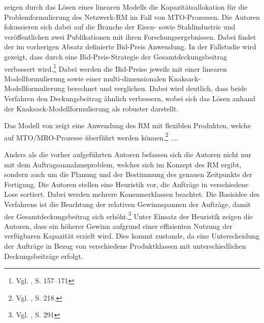 \cite{rehkopf:2005aa} zeigen durch das Lösen eines linearen Modells die Kapazitätsallokation für die Problemformulierung des Netzwerk-RM im Fall von MTO-Prozessen. Die Autoren fokussieren sich dabei auf die Branche der Eisen- sowie Stahlindustrie und veröffentlichen zwei Publikationen mit ihren Forschungsergebnissen. Dabei findet der im vorherigen Absatz definierte Bid-Preis Anwendung. In der Fallstudie wird gezeigt, dass durch eine Bid-Preis-Strategie der Gesamtdeckungsbeitrag verbessert wird.\footnote{Vgl. \cite{Spengler:2007aa}, S. 157–171} Dabei werden die Bid-Preise jeweils mit einer linearen Modellformulierung sowie einer multi-dimensionalen Knaksack-Modell\-for\-mu\-lier\-ung berechnet und verglichen. Dabei wird deutlich, dass beide Verfahren den Deckungsbeitrag ähnlich verbessern, wobei sich das Lösen anhand der Knaksack-Modell\-for\-mu\-lier\-ung als robuster darstellt. 

Das Modell von \cite{petrick2012using} zeigt eine Anwendung des RM mit flexiblen Produkten, welche auf MTO/MRO-Prozesse überführt werden können.\footnote{Vgl. \cite{petrick2012using}, S. 218.} ....

Anders als die vorher aufgeführten Autoren befassen sich die Autoren \cite{DECI:DECI074} nicht nur mit dem Auftragsannahmeproblem, welches sich im Konzept des RM ergibt, sondern auch um die Planung und der Bestimmung des genauen Zeitpunkts der Fertigung. Die Autoren stellen eine Heuristik vor, die Aufträge in verschiedene Lose sortiert. Dabei werden mehrere Konsumerklassen beachtet. Die Basisidee des Verfahrens ist die Beachtung der relativen Gewinnspannen der Aufträge, damit der Gesamtdeckungsbeitrag sich erhöht.\footnote{Vgl. \cite{DECI:DECI074}, S. 291} Unter Einsatz der Heuristik zeigen die Autoren, dass ein höherer Gewinn aufgrund einer effizienten Nutzung der verfügbaren Kapazität erzielt wird. Dies kommt zustande, da eine Unterscheidung der Aufträge in Bezug von verschiedene Produktklassen mit unterschiedlichen Deckungsbeiträge erfolgt.




